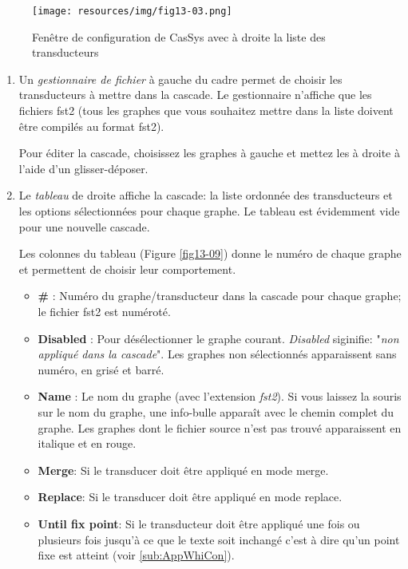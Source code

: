 \begin{figure}[!htb]
  \centering
  \texttt{[image: resources/img/fig13-03.png]}
  \caption{Fenêtre de configuration de CasSys avec à droite la liste des transducteurs}
  \label{fig13-03}
\end{figure}

\begin{enumerate}
	\item Un \textit{gestionnaire de fichier} à gauche du cadre permet de choisir les transducteurs à mettre dans la cascade.
	Le gestionnaire n'affiche que les fichiers fst2 (tous les graphes que vous souhaitez mettre dans la liste doivent être compilés au format fst2).
	
	Pour éditer la cascade, choisissez les graphes à gauche et mettez les à droite à l'aide d'un glisser-déposer.
\item Le \textit{tableau} de droite affiche la cascade: la liste ordonnée des transducteurs et les options sélectionnées pour chaque graphe.
		Le tableau est évidemment vide pour une nouvelle cascade.
		 
		Les colonnes du tableau (Figure \ref{fig13-09}) donne le numéro de chaque graphe et permettent de choisir leur comportement.
	\begin{itemize}
	\item \textbf{\#} : Numéro du graphe/transducteur dans la cascade pour chaque graphe; le fichier fst2 est numéroté.
	\item \textbf{Disabled} : Pour désélectionner le graphe courant. \textit{Disabled} siginifie: "\textit{non appliqué dans la cascade}".
		Les graphes non sélectionnés apparaissent sans numéro, en grisé et barré.
	\item \textbf{Name} : Le nom du graphe (avec l'extension \emph{fst2}). Si vous laissez la souris sur le nom du graphe,
		une info-bulle apparaît avec le chemin complet du graphe.
		Les graphes dont le fichier source n'est pas trouvé apparaissent en italique et en rouge.

	\item \textbf{Merge}: Si le transducer doit être appliqué en mode merge.
	\item \textbf{Replace}: Si le transducer doit être appliqué en mode replace.
	\item \textbf{Until fix point}: Si le transducteur doit être appliqué une fois ou plusieurs fois
		jusqu'à ce que le texte soit inchangé c'est à dire qu'un point fixe est atteint (voir \ref{sub:AppWhiCon}).
	\end{itemize}
	

\end{enumerate}
